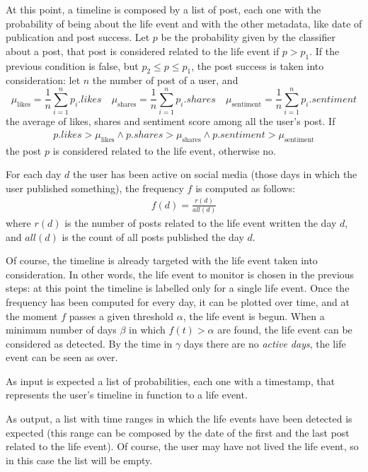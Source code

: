 At this point, a timeline is composed by a list of post, each one with the probability of being about the life event and with the other metadata, like date of publication and post success. Let $p$ be the probability given by the classifier about a post, that post is considered related to the life event if $ p > p_1$. If the previous condition is false, but $p_2 \leq p \leq p_1 $, the post success is taken into consideration: let $n$ the number of post of a user, and
\[
\mu_\text{likes} = \frac{1}{n} \sum_{i=1}^n p_i.likes \quad \mu_\text{shares} = \frac{1}{n} \sum_{i=1}^n p_i.shares \quad \mu_\text{sentiment} = \frac{1}{n} \sum_{i=1}^n p_i.sentiment
\]
the average of likes, shares and sentiment score among all the user's post. If 
\begin{gather}
\label{avgs}
p.likes > \mu_\text{likes} \land p.shares > \mu_\text{shares} \land p.sentiment > \mu_\text{sentiment}
\end{gather}
the post $p$ is considered related to the life event, otherwise no.

For each day $d$ the user has been active on social media (those days in which the user published something), the frequency $f$ is computed as follows:
\begin{gather}
f(d) = \frac{r(d)}{all(d)}
\label{freq}
\end{gather}
where $r(d)$ is the number of posts related to the life event written the day $d$, and $all(d)$ is the count of all posts published the day $d$.

Of course, the timeline is already targeted with the life event taken into consideration. In other words, the life event to monitor is chosen in the previous steps: at this point the timeline is labelled only for a single life event. Once the frequency has been computed for every day, it can be plotted over time, and at the moment $f$ passes a given threshold $\alpha$, the life event is begun. When a minimum number of days $\beta$ in which $f(t) > \alpha$ are found, the life event can be considered as detected. By the time in $\gamma$ days there are no \emph{active days}, the life event can be seen as over.

As input is expected a list of probabilities, each one with a timestamp, that represents the user's timeline in function to a life event.

As output, a list with time ranges in which the life events have been detected is expected (this range can be composed by the date of the first and the last post related to the life event). Of course, the user may have not lived the life event, so in this case the list will be empty.

